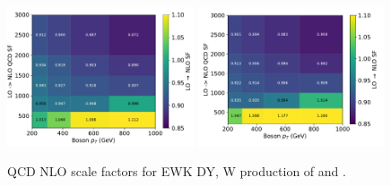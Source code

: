 \begin{figure}[ht!]
    \begin{center}
        \includegraphics[width=0.49\textwidth]{fig/theory/nlo_qcd_for_ewk_dy.pdf}
        \includegraphics[width=0.49\textwidth]{fig/theory/nlo_qcd_for_ewk_w.pdf}
        \caption{
            QCD NLO scale factors for EWK DY, W production of \ptv and \mjj.
          }
      \label{fig:theory_sf_qcd_nlo_for_ewk}
    \end{center}
  \end{figure}